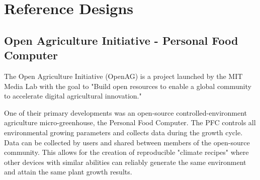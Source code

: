\documentclass{report}
\begin{document}

\newpage

\section{Reference Designs}


\subsection{Open Agriculture Initiative - Personal Food Computer}




The Open Agriculture Initiative (OpenAG) is a project launched by the MIT Media Lab with the goal to "Build open resources to enable a global community to accelerate digital agricultural innovation." 

One of their primary developments was an open-source controlled-environment agriculture micro-greenhouse, the Personal Food Computer.
The PFC controls all environmental growing parameters and collects data during the growth cycle.
Data can be collected by users and shared between members of the open-source community.
This allows for the creation of reproducible "climate recipes" where other devices with similar abilities can reliably generate the same environment and attain the same plant growth results.

\end{document}
